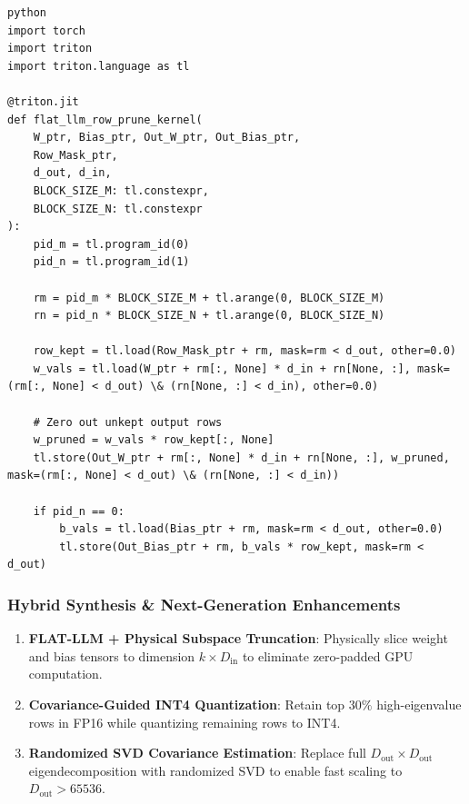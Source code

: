 \vspace{0.5em}
\begin{mdframed}[backgroundcolor=codebg, linecolor=codeframe, linewidth=1pt, roundcorner=4pt, innerleftmargin=2pt, innerrightmargin=5pt, innertopmargin=5pt, innerbottommargin=5pt]
\begin{lstlisting}
python
import torch
import triton
import triton.language as tl

@triton.jit
def flat_llm_row_prune_kernel(
    W_ptr, Bias_ptr, Out_W_ptr, Out_Bias_ptr,
    Row_Mask_ptr,
    d_out, d_in,
    BLOCK_SIZE_M: tl.constexpr,
    BLOCK_SIZE_N: tl.constexpr
):
    pid_m = tl.program_id(0)
    pid_n = tl.program_id(1)

    rm = pid_m * BLOCK_SIZE_M + tl.arange(0, BLOCK_SIZE_M)
    rn = pid_n * BLOCK_SIZE_N + tl.arange(0, BLOCK_SIZE_N)

    row_kept = tl.load(Row_Mask_ptr + rm, mask=rm < d_out, other=0.0)
    w_vals = tl.load(W_ptr + rm[:, None] * d_in + rn[None, :], mask=(rm[:, None] < d_out) \& (rn[None, :] < d_in), other=0.0)

    # Zero out unkept output rows
    w_pruned = w_vals * row_kept[:, None]
    tl.store(Out_W_ptr + rm[:, None] * d_in + rn[None, :], w_pruned, mask=(rm[:, None] < d_out) \& (rn[None, :] < d_in))

    if pid_n == 0:
        b_vals = tl.load(Bias_ptr + rm, mask=rm < d_out, other=0.0)
        tl.store(Out_Bias_ptr + rm, b_vals * row_kept, mask=rm < d_out)
\end{lstlisting}
\end{mdframed}
\vspace{0.5em}


\subsubsection*{Hybrid Synthesis \& Next-Generation Enhancements}

\begin{enumerate}
\item \textbf{FLAT-LLM + Physical Subspace Truncation}: Physically slice weight and bias tensors to dimension $k \times D_{\text{in}}$ to eliminate zero-padded GPU computation.
\item \textbf{Covariance-Guided INT4 Quantization}: Retain top $30\%$ high-eigenvalue rows in FP16 while quantizing remaining rows to INT4.
\item \textbf{Randomized SVD Covariance Estimation}: Replace full $D_{\text{out}} \times D_{\text{out}}$ eigendecomposition with randomized SVD to enable fast scaling to $D_{\text{out}} > 65536$.

\end{enumerate}
